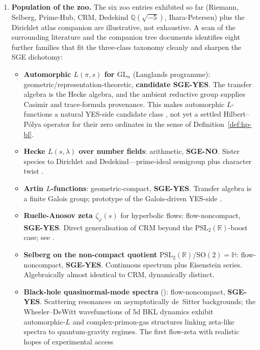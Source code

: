 \documentclass[11pt]{article}
\theoremstyle{definition}
\theoremstyle{remark}
\newcommand{\PSL}{\mathrm{PSL}}
\begin{document}
\begin{enumerate}
\item \textbf{Population of the zoo.} The six zoo entries exhibited
  so far (Riemann, Selberg, Prime-Hub, CRM, Dedekind
  $\mathbb{Q}(\sqrt{-5})$, Ihara-Petersen) plus the Dirichlet atlas
  companion \cite{DirichletAtlas} are illustrative, not exhaustive.
  A scan of the surrounding literature and the companion tree
  documents \cite{CandidatesMasterList} identifies eight further
  families that fit the three-class taxonomy cleanly and sharpen
  the SGE dichotomy:
  \begin{itemize}
  \item \textbf{Automorphic $L(\pi, s)$ for $\mathrm{GL}_n$}
  (Langlands programme): geometric/representation-theoretic,
  \textbf{candidate SGE-YES}. The transfer algebra is the Hecke
  algebra, and the ambient reductive group supplies Casimir and
  trace-formula provenance. This makes automorphic $L$-functions a
  natural YES-side candidate class \cite{Langlands1970,CogdellPS1994},
  not yet a settled
  Hilbert--P\'olya operator for their zero ordinates in the sense of
  Definition~\ref{def:hp-bl}.
  \item \textbf{Hecke $L(s, \lambda)$ over number fields}:
  arithmetic, \textbf{SGE-NO}. Sister species to Dirichlet and
  Dedekind---prime-ideal semigroup plus character twist
  \cite{IwaniecKowalski}.
  \item \textbf{Artin $L$-functions}: geometric-compact,
  \textbf{SGE-YES}. Transfer algebra is a finite Galois group;
  prototype of the Galois-driven YES-side
  \cite{Artin1931,Chebotarev1926}.
  \item \textbf{Ruelle-Anosov zeta $\zeta_\varphi(s)$} for hyperbolic
  flows: flow-noncompact, \textbf{SGE-YES}. Direct generalisation
  of CRM beyond the $\PSL_2(\mathbb{R})$-boost case; see
  \cite{DyatlovZworski2016,DyatlovZworski2019}.
  \item \textbf{Selberg on the non-compact quotient}
  $\mathrm{PSL}_2(\mathbb{R})/\mathrm{SO}(2) = \mathbb{H}$:
  flow-noncompact, \textbf{SGE-YES}. Continuous spectrum plus
  Eisenstein series. Algebraically almost identical to CRM,
  dynamically distinct.
  \item \textbf{Black-hole quasinormal-mode spectra}
  (\cite{DeClerckHartnollYang2025}): flow-noncompact,
  \textbf{SGE-YES}. Scattering resonances on asymptotically
  de~Sitter backgrounds; the Wheeler--DeWitt wavefunctions of 5d
  BKL dynamics exhibit automorphic-$L$ and complex-primon-gas
  structures linking zeta-like spectra to quantum-gravity regimes.
  The first flow-zeta with realistic hopes of experimental access

\end{itemize}
\end{enumerate}
\end{document}
